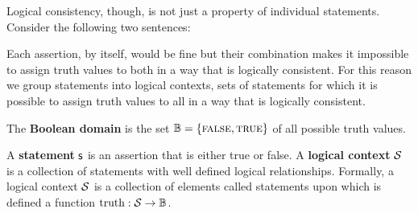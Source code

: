 \documentclass[11pt,letterpaper,fleqn]{memoir} %
\begin{document}
Logical consistency, though, is not just a property of individual statements. Consider the following two sentences:
\begin{description}
	\item {}
	\item {}
\end{description}
Each assertion, by itself, would be fine but their combination makes it impossible to assign truth values to both in a way that is logically consistent. For this reason we group statements into logical contexts, sets of statements for which it is possible to assign truth values to all in a way that is logically consistent.

\begin{mathSection}
\begin{defn}
	The \textbf{Boolean domain} is the set $\mathbb{B} = \{\textsc{false}, \textsc{true}\}$ of all possible truth values.
\end{defn}


\begin{axiom}\label{ax_statement}
	A \textbf{statement} $\mathsf{s}$ is an assertion that is either true or false. A \textbf{logical context} $\mathcal{S}$ is a collection of statements with well defined logical relationships. Formally, a logical context $\mathcal{S}$ is a collection of elements called statements upon which is defined a function $\operatorname{truth}: \mathcal{S} \to \mathbb{B}$.
\end{axiom}

\end{mathSection}
\end{document}
